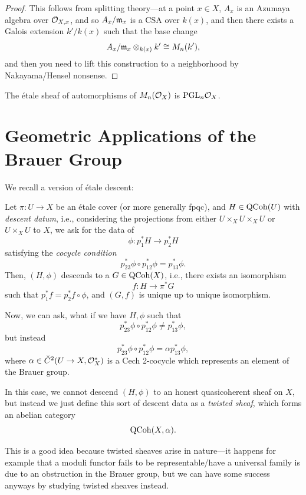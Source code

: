 \documentclass[12pt]{article}
\newcommand{\PGL}{\mathrm{PGL}}
\begin{document}
\begin{proof}
    This follows from splitting theory---at a point $x\in X$, $A_x$ is an Azumaya algebra over $\mathcal{O}_{X,x}$, and so $A_x/\mathfrak{m}_x$ is a CSA over $k(x)$, and then there exists a Galois extension $k'/k(x)$ such that the base change
    \[A_x/\mathfrak{m}_x \otimes_{k(x)} k' \cong M_n(k'),\]
    and then you need to {\color{red} lift this construction to a neighborhood by Nakayama/Hensel nonsense}.
\end{proof}

\begin{lem}
    The \'etale sheaf of automorphisms of $M_n(\mathcal{O}_X)$ is $\PGL_n \cO_X$.
\end{lem}


\section{Geometric Applications of the Brauer Group}

We recall a version of \'etale descent:

\begin{prop}
    Let $\pi:U\to X$ be an \'etale cover (or more generally fpqc), and $H\in \mathrm{QCoh}(U)$ with \textit{descent datum}, i.e., considering the projections from either $U\times_X U\times_X U$ or $U\times_X U$ to $X$, we ask for the data of
    \[\phi: p_1^*H \to p_2^*H\]
    satisfying the \textit{cocycle condition}
    \[p_{23}^* \phi \circ p_{12}^* \phi = p_{13}^* \phi.\]
    Then, $(H,\phi)$ descends to a $G\in \mathrm{QCoh}(X)$, i.e., there exists an isomorphism
    \[f: H \to \pi^*G\]
    such that $p_1^*f = p_2^*f \circ \phi$, and $(G,f)$ is unique up to unique isomorphism.
\end{prop}

Now, we can ask, what if we have $H,\phi$ such that
\[p_{23}^* \phi \circ p_{12}^* \phi \neq p_{13}^* \phi,\]
but instead
\[p_{23}^* \phi \circ p_{12}^* \phi = \alpha p_{13}^* \phi,\]
where $\alpha\in \check{C}^2(U\to X,\mathcal{O}_X^*)$ is a Cech 2-cocycle which represents an element of the Brauer group.

In this case, we cannot descend $(H,\phi)$ to an honest quasicoherent sheaf on $X$, but instead we just define this sort of descent data as a \textit{twisted sheaf}, which forms an abelian category
\[\mathrm{QCoh}(X,\alpha).\]

This is a good idea because twisted sheaves arise in nature---it happens for example that a moduli functor fails to be representable/have a universal family is due to an obstruction in the Brauer group, but we can have some success anyways by studying twisted sheaves instead.
\end{document}
